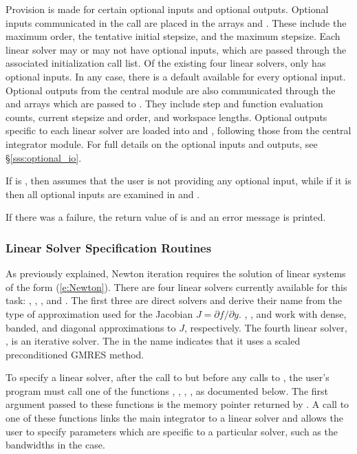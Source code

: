 Provision is made for certain optional inputs and optional outputs.
Optional inputs communicated in the  call are placed
in the arrays  and .  These include the maximum
order, the tentative initial stepsize, and the maximum stepsize.  Each
{\cvodes} linear solver may or may not have optional inputs, which are
passed through the associated initialization call list.  Of the existing four
linear solvers, only {\cvspgmr} has optional inputs.  In any case, there
is a default available for every optional input.  Optional outputs
from the central {\cvodes} module are also communicated through the
 and  arrays which are passed to .
They include step and function evaluation counts, current stepsize and
order, and workspace lengths.  Optional outputs
specific to each linear solver are loaded into  and
, following those from the central integrator module.
For full details on the optional inputs and outputs, see
\S\ref{sss:optional_io}.

If  is , then {\cvodes} assumes that the user is not providing
any optional input, while if it is  then all optional inputs 
are examined in  and . 

If there was a failure, the return value of  is  and
an error message is printed.

\subsubsection{Linear Solver Specification Routines}\label{sss:lin_solv_init}

As previously explained, Newton iteration requires the solution of
linear systems of the form (\ref{e:Newton}).  There are four {\cvodes} linear
solvers currently available for this task: {\cvdense}, {\cvband}, {\cvdiag},
and {\cvspgmr}.  The first three are direct solvers and derive their name
from the type of approximation used for the Jacobian 
$J = \partial{f}/\partial{y}$.  {\cvdense}, {\cvband}, and {\cvdiag} work with
dense, banded, and diagonal approximations to $J$, respectively.  The
fourth {\cvodes} linear solver, {\cvspgmr}, is an iterative solver.  The {\spgmr}
in the name indicates that it uses a scaled preconditioned
GMRES method.

To specify a {\cvodes} linear solver, after the call to 
but before any calls to , the user's program must call one
of the functions , , , ,
as documented below. The first argument passed to these functions is the {\cvodes}
memory pointer returned by .  A call to one of these
functions links the main {\cvodes} integrator to a linear solver and
allows the user to specify parameters which are specific to a
particular solver, such as the bandwidths in the {\cvband} case.

